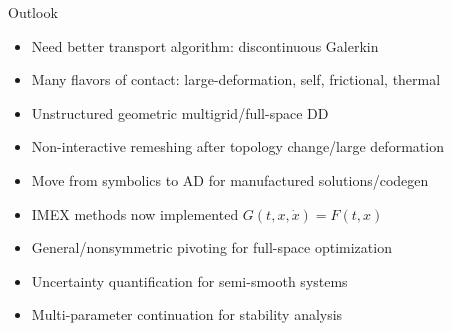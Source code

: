 \documentclass{beamer}
\begin{document}
\begin{frame}{Outlook}
  \begin{itemize}
  \item Need better transport algorithm: discontinuous Galerkin
  \item Many flavors of contact: large-deformation, self, frictional, thermal
  \item Unstructured geometric multigrid/full-space DD
  \item Non-interactive remeshing after topology change/large deformation
  \item Move from symbolics to AD for manufactured solutions/codegen
  \item IMEX methods now implemented $G(t,x,\dot x) = F(t,x)$
  \item General/nonsymmetric pivoting for full-space optimization
  \item Uncertainty quantification for semi-smooth systems
  \item Multi-parameter continuation for stability analysis
  \end{itemize}
\end{frame}
\end{document}
